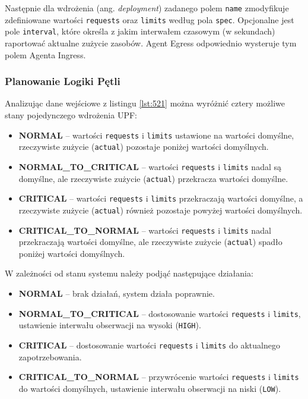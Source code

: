 Następnie dla wdrożenia (ang. \textit{deployment}) zadanego polem \texttt{name} zmodyfikuje zdefiniowane wartości \texttt{requests} oraz \texttt{limits} według pola \texttt{spec}. Opcjonalne jest pole \texttt{interval}, które określa z jakim interwałem czasowym (w sekundach) raportować aktualne zużycie zasobów. Agent Egress odpowiednio wysteruje tym polem Agenta Ingress.

\subsubsection{Planowanie Logiki Pętli}

Analizując dane wejściowe z listingu \ref{lst:521} można wyróżnić cztery możliwe stany pojedynczego wdrożenia UPF:
\begin{itemize}
    \item \textbf{NORMAL} – wartości \texttt{requests} i \texttt{limits} ustawione na wartości domyślne, rzeczywiste zużycie (\texttt{actual}) pozostaje poniżej wartości domyślnych.
    \item \textbf{NORMAL\_TO\_CRITICAL} – wartości \texttt{requests} i \texttt{limits} nadal są domyślne, ale rzeczywiste zużycie (\texttt{actual}) przekracza wartości domyślne.
    \item \textbf{CRITICAL} – wartości \texttt{requests} i \texttt{limits} przekraczają wartości domyślne, a rzeczywiste zużycie (\texttt{actual}) również pozostaje powyżej wartości domyślnych.
    \item \textbf{CRITICAL\_TO\_NORMAL} – wartości \texttt{requests} i \texttt{limits} nadal przekraczają wartości domyślne, ale rzeczywiste zużycie (\texttt{actual}) spadło poniżej wartości domyślnych.
\end{itemize}

W zależności od stanu systemu należy podjąć następujące działania:
\begin{itemize}
    \item \textbf{NORMAL} – brak działań, system działa poprawnie.
    \item \textbf{NORMAL\_TO\_CRITICAL} – dostosowanie wartości \texttt{requests} i \texttt{limits}, ustawienie interwału obserwacji na wysoki (\texttt{HIGH}).
    \item \textbf{CRITICAL} – dostosowanie wartości \texttt{requests} i \texttt{limits} do aktualnego zapotrzebowania.
    \item \textbf{CRITICAL\_TO\_NORMAL} – przywrócenie wartości \texttt{requests} i \texttt{limits} do wartości domyślnych, ustawienie interwału obserwacji na niski (\texttt{LOW}).
\end{itemize}

